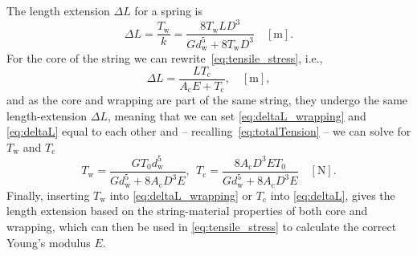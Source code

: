 \documentclass{article}
\begin{document}
\begin{sloppy}
%
The length extension $\Delta L$ for a spring is
%
\begin{equation}\label{eq:deltaL_wrapping}
    \Delta L = \frac{T_\text{w}}{k} = \frac{8T_\text{w}LD^3}{Gd_\text{w}^5 + 8T_\text{w}D^3} \quad [\text{m}].
\end{equation}
%
For the core of the string we can rewrite~\eqref{eq:tensile_stress}, i.e.,
%
\begin{equation}\label{eq:deltaL}
    \Delta L= \frac{LT_\text{c}}{A_\text{c}E + T_\text{c}}, \quad  [\text{m}], 
\end{equation}
%
and as the core and wrapping are part of the same string, they undergo the same length-extension $\Delta L$, meaning that we can set \eqref{eq:deltaL_wrapping} and \eqref{eq:deltaL} equal to each other and -- recalling~\eqref{eq:totalTension} -- we can solve for $T_\text{w}$ and $T_\text{c}$
%
%
\begin{equation}
    T_\text{w} = \frac{GT_0d_\text{w}^5}{Gd_\text{w}^5 + 8A_\text{c}D^3E}, \ \ T_\text{c} = \frac{8A_\text{c}D^3ET_0}{Gd_\text{w}^5+8A_\text{c}D^3E}\quad [\text{N}].
\end{equation}
%
%
Finally, inserting $T_\text{w}$ into \eqref{eq:deltaL_wrapping} or $T_\text{c}$ into \eqref{eq:deltaL}, gives the length extension based on the string-material properties of both core and wrapping, which can then be used in \eqref{eq:tensile_stress} to calculate the correct Young's modulus $E$.


\end{sloppy}
\end{document}
